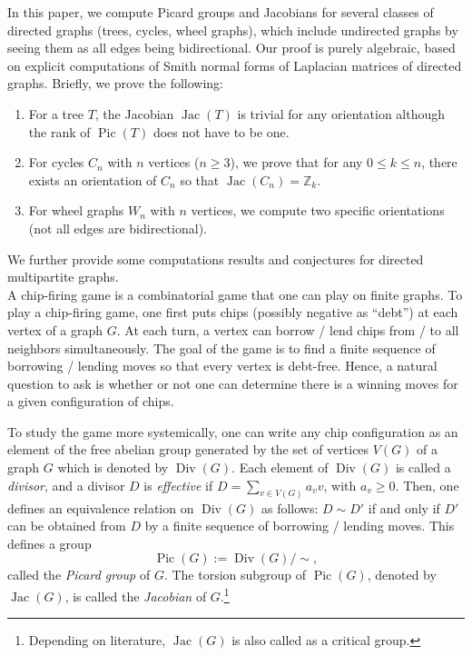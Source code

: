 \documentclass[11pt,reqno]{amsart}
\DeclareMathOperator{\Pic}{Pic}
\DeclareMathOperator{\Jac}{Jac}
\DeclareMathOperator{\Div}{Div}
\theoremstyle{definition}
\theoremstyle{plain}
\begin{document}
In this paper, we compute Picard groups and Jacobians for several classes of directed graphs (trees, cycles, wheel graphs), which include undirected graphs by seeing them as all edges being bidirectional. Our proof is purely algebraic, based on explicit computations of Smith normal forms of Laplacian matrices of directed graphs. Briefly, we prove the following:
\begin{enumerate}
	\item 
For a tree $T$, the Jacobian $\Jac(T)$ is trivial for any orientation although the rank of $\Pic(T)$ does not have to be one.
\item 
For cycles $C_n$ with $n$ vertices ($n\geq 3$), we prove that for any $0 \leq k \leq n$, there exists an orientation of $C_n$ so that $\Jac(C_n)=\mathbb{Z}_k$. 
\item 
For wheel graphs $W_n$ with $n$ vertices, we compute two specific orientations (not all edges are bidirectional).
\end{enumerate}
We further provide some computations results and conjectures for directed multipartite graphs.\\


A chip-firing game is a combinatorial game that one can play on finite graphs. To play a chip-firing game, one first puts chips (possibly negative as ``debt'') at each vertex of a graph $G$. At each turn, a vertex can borrow / lend chips from / to all neighbors simultaneously. The goal of the game is to find a finite sequence of borrowing / lending moves so that every vertex is debt-free. Hence, a natural question to ask is whether or not one can determine there is a winning moves for a given configuration of chips. 

To study the game more systemically, one can write any chip configuration as an element of the free abelian group generated by the set of vertices $V(G)$ of a graph $G$ which is denoted by $\Div(G)$. Each element of $\Div(G)$ is called a \textit{divisor}, and a divisor $D$ is \textit{effective} if $D=\sum_{v \in V(G)} a_v v$, with $a_v \geq 0$. Then, one defines an equivalence relation on $\Div(G)$ as follows: $D\sim D'$ if and only if $D'$ can be obtained from $D$ by a finite sequence of borrowing / lending moves. This defines a group 
\[
\Pic(G):=\Div(G)/\sim,
\]
called the \textit{Picard group} of $G$. 
The torsion subgroup of $\Pic(G)$, denoted by $\Jac(G)$, is called the \textit{Jacobian} of $G$.\footnote{Depending on literature, $\Jac(G)$ is also called as a critical group.}
\end{document}
